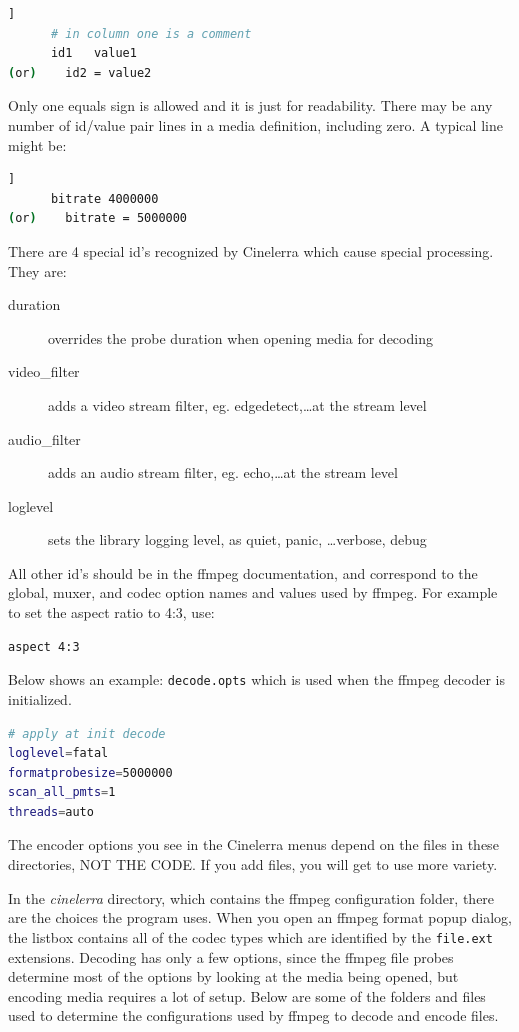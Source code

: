 \begin{lstlisting}[language=bash,numbers=none]]
      # in column one is a comment
      id1   value1
(or)	id2 = value2
\end{lstlisting}

Only one equals sign is allowed and it is just for readability.  There may be any number of id/value pair lines in a media definition, including zero. A typical line might be:

\begin{lstlisting}[language=bash,numbers=none]]
      bitrate 4000000
(or)	bitrate = 5000000
\end{lstlisting}

There are 4 special id's recognized by Cinelerra which cause special processing.  They are:

\begin{description}
    \item[duration] overrides the probe duration when opening media for decoding
    \item[video\_filter] adds a video stream filter, eg. edgedetect,\dots at the stream level
    \item[audio\_filter] adds an audio stream filter, eg. echo,\dots at the stream level
    \item[loglevel] sets the library logging level, as quiet, panic, \dots verbose, debug
\end{description}

All other id's should be in the ffmpeg documentation, and correspond to the global, muxer, and codec option names and values used by ffmpeg.  For example to set the aspect ratio to 4:3, use:

\begin{lstlisting}[language=bash,numbers=none]
aspect 4:3
\end{lstlisting}

Below shows an example:  \texttt{decode.opts} which is used when the ffmpeg decoder is initialized.

\begin{lstlisting}[language=bash,numbers=none]
# apply at init decode
loglevel=fatal
formatprobesize=5000000
scan_all_pmts=1
threads=auto
\end{lstlisting}

The encoder options you see in the Cinelerra menus depend on the files in these directories, \textsc{NOT THE CODE}.  If you add files, you will get to use more variety.

In the \textit{cinelerra} directory, which contains the ffmpeg configuration folder, there are the choices the program uses.  When you open an ffmpeg format popup dialog, the listbox contains all of the codec types which are identified by the \texttt{file.ext} extensions.  Decoding has only a few options, since the ffmpeg file probes determine most of the options by looking at the media being opened, but encoding media requires a lot of setup.  Below are some of the folders and files used to determine the configurations used by ffmpeg to decode and encode files.

